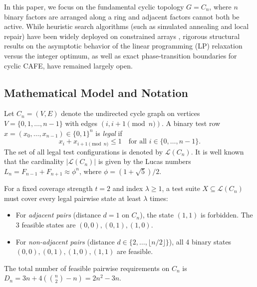 \documentclass[11pt,a4paper]{article}
\theoremstyle{definition}
\theoremstyle{remark}
\begin{document}
In this paper, we focus on the fundamental cyclic topology $G = C_n$, where $n$ binary factors are arranged along a ring and adjacent factors cannot both be active. While heuristic search algorithms (such as simulated annealing and local repair) have been widely deployed on constrained arrays \cite{cohen2008constructing,colbourn2004combinatorial}, rigorous structural results on the asymptotic behavior of the linear programming (LP) relaxation versus the integer optimum, as well as exact phase-transition boundaries for cyclic CAFE, have remained largely open.

\subsection{Mathematical Model and Notation}

Let $C_n = (V, E)$ denote the undirected cycle graph on vertices $V = \{0, 1, \dots, n-1\}$ with edges $(i, i+1 \pmod n)$. A binary test row $x = (x_0, \dots, x_{n-1}) \in \{0, 1\}^n$ is \emph{legal} if
\begin{equation}
    x_i + x_{i+1 \pmod n} \le 1 \quad \text{for all } i \in \{0, \dots, n-1\}.
\end{equation}
The set of all legal test configurations is denoted by $\mathcal{L}(C_n)$. It is well known that the cardinality $|\mathcal{L}(C_n)|$ is given by the Lucas numbers $L_n = F_{n-1} + F_{n+1} \approx \phi^n$, where $\phi = (1+\sqrt{5})/2$.

For a fixed coverage strength $t = 2$ and index $\lambda \ge 1$, a test suite $X \subseteq \mathcal{L}(C_n)$ must cover every legal pairwise state at least $\lambda$ times:
\begin{itemize}
    \item For \emph{adjacent pairs} (distance $d = 1$ on $C_n$), the state $(1, 1)$ is forbidden. The 3 feasible states are $(0, 0), (0, 1), (1, 0)$.
    \item For \emph{non-adjacent pairs} (distance $d \in \{2, \dots, \lfloor n/2 \rfloor\}$), all 4 binary states $(0, 0), (0, 1), (1, 0), (1, 1)$ are feasible.
\end{itemize}
The total number of feasible pairwise requirements on $C_n$ is $D_n = 3n + 4\left(\binom{n}{2} - n\right) = 2n^2 - 3n$.
\end{document}
